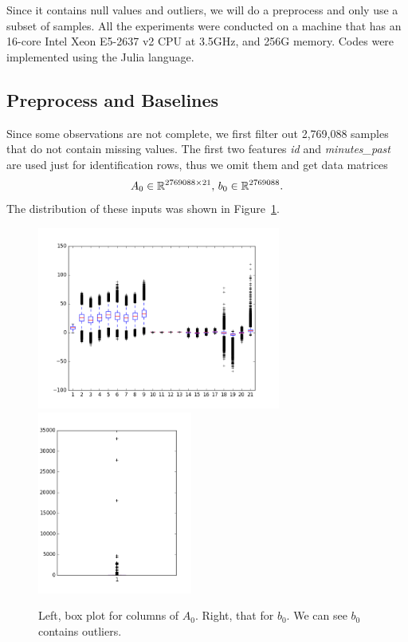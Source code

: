 Since it contains null values and outliers,
we will do a preprocess and only use a subset of samples.
All the experiments were conducted on a machine
that has an 16-core Intel Xeon E5-2637 v2 CPU at 3.5GHz,
and 256G memory.
Codes were implemented using the Julia language.

\subsection{Preprocess and Baselines}

Since some observations are not complete,
we first filter out 2,769,088 samples that do not contain missing values.
The first two features \emph{id} and \emph{minutes\_past}
are used just for identification rows,
thus we omit them and
get data matrices
\begin{equation}
    A_0 \in {\mathbb{R}}^{2769088\times 21}, \,
    b_0\in{\mathbb{R}}^{2769088}.
\end{equation}
The distribution of these inputs was shown in Figure~\ref{fig:box}.
\begin{figure}[htb]
	\centering
	\includegraphics[height=6cm]{fig/box_a_0.png}
	\includegraphics[height=6cm]{fig/box_b_0.png}
	\caption{\small
		Left, box plot for columns of $A_0$.
        Right, that for $b_0$.
        We can see $b_0$ contains outliers.}
	\label{fig:box}
\end{figure}

